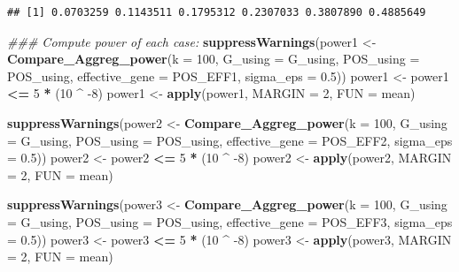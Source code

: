 \documentclass[
]{article}
\newenvironment{Shaded}{\begin{snugshade}}{\end{snugshade}}
\newcommand{\CommentTok}[1]{\textcolor[rgb]{0.56,0.35,0.01}{\textit{#1}}}
\newcommand{\DataTypeTok}[1]{\textcolor[rgb]{0.13,0.29,0.53}{#1}}
\newcommand{\DecValTok}[1]{\textcolor[rgb]{0.00,0.00,0.81}{#1}}
\newcommand{\FloatTok}[1]{\textcolor[rgb]{0.00,0.00,0.81}{#1}}
\newcommand{\KeywordTok}[1]{\textcolor[rgb]{0.13,0.29,0.53}{\textbf{#1}}}
\newcommand{\NormalTok}[1]{#1}
\newcommand{\OperatorTok}[1]{\textcolor[rgb]{0.81,0.36,0.00}{\textbf{#1}}}
\newcommand{\StringTok}[1]{\textcolor[rgb]{0.31,0.60,0.02}{#1}}
\begin{document}
\begin{Shaded}
\end{Shaded}

\begin{verbatim}
## [1] 0.0703259 0.1143511 0.1795312 0.2307033 0.3807890 0.4885649
\end{verbatim}

\begin{Shaded}
\begin{Highlighting}[]
\CommentTok{### Compute power of each case:}
\KeywordTok{suppressWarnings}\NormalTok{(power1 <-}\StringTok{ }\KeywordTok{Compare_Aggreg_power}\NormalTok{(}\DataTypeTok{k =} \DecValTok{100}\NormalTok{, }\DataTypeTok{G_using =}\NormalTok{ G_using, }\DataTypeTok{POS_using =}\NormalTok{ POS_using, }\DataTypeTok{effective_gene =}\NormalTok{ POS_EFF1, }\DataTypeTok{sigma_eps =} \FloatTok{0.5}\NormalTok{))}
\NormalTok{power1 <-}\StringTok{ }\NormalTok{power1 }\OperatorTok{<=}\StringTok{ }\DecValTok{5} \OperatorTok{*}\StringTok{ }\NormalTok{(}\DecValTok{10} \OperatorTok{^}\StringTok{ }\DecValTok{-8}\NormalTok{)}
\NormalTok{power1 <-}\StringTok{ }\KeywordTok{apply}\NormalTok{(power1, }\DataTypeTok{MARGIN =} \DecValTok{2}\NormalTok{, }\DataTypeTok{FUN =}\NormalTok{ mean)}

\KeywordTok{suppressWarnings}\NormalTok{(power2 <-}\StringTok{ }\KeywordTok{Compare_Aggreg_power}\NormalTok{(}\DataTypeTok{k =} \DecValTok{100}\NormalTok{, }\DataTypeTok{G_using =}\NormalTok{ G_using, }\DataTypeTok{POS_using =}\NormalTok{ POS_using, }\DataTypeTok{effective_gene =}\NormalTok{ POS_EFF2, }\DataTypeTok{sigma_eps =} \FloatTok{0.5}\NormalTok{))}
\NormalTok{power2 <-}\StringTok{ }\NormalTok{power2 }\OperatorTok{<=}\StringTok{ }\DecValTok{5} \OperatorTok{*}\StringTok{ }\NormalTok{(}\DecValTok{10} \OperatorTok{^}\StringTok{ }\DecValTok{-8}\NormalTok{)}
\NormalTok{power2 <-}\StringTok{ }\KeywordTok{apply}\NormalTok{(power2, }\DataTypeTok{MARGIN =} \DecValTok{2}\NormalTok{, }\DataTypeTok{FUN =}\NormalTok{ mean)}

\KeywordTok{suppressWarnings}\NormalTok{(power3 <-}\StringTok{ }\KeywordTok{Compare_Aggreg_power}\NormalTok{(}\DataTypeTok{k =} \DecValTok{100}\NormalTok{, }\DataTypeTok{G_using =}\NormalTok{ G_using, }\DataTypeTok{POS_using =}\NormalTok{ POS_using, }\DataTypeTok{effective_gene =}\NormalTok{ POS_EFF3, }\DataTypeTok{sigma_eps =} \FloatTok{0.5}\NormalTok{))}
\NormalTok{power3 <-}\StringTok{ }\NormalTok{power3 }\OperatorTok{<=}\StringTok{ }\DecValTok{5} \OperatorTok{*}\StringTok{ }\NormalTok{(}\DecValTok{10} \OperatorTok{^}\StringTok{ }\DecValTok{-8}\NormalTok{)}
\NormalTok{power3 <-}\StringTok{ }\KeywordTok{apply}\NormalTok{(power3, }\DataTypeTok{MARGIN =} \DecValTok{2}\NormalTok{, }\DataTypeTok{FUN =}\NormalTok{ mean)}


\end{Highlighting}
\end{Shaded}
\end{document}
